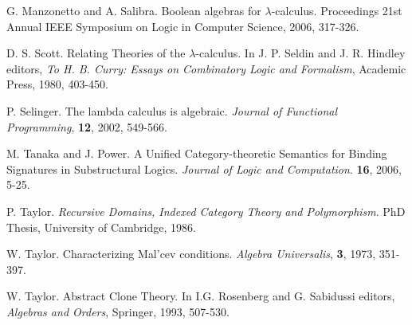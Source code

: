 \documentclass[12pt, amstex, amssymb]{article}
\begin{document}
\begin{thebibliography}{length}
G. Manzonetto and A. Salibra. Boolean algebras for $\lambda$-calculus.
Proceedings 21st Annual IEEE Symposium on Logic in Computer Science, 2006,
317-326.


D. S. Scott. Relating Theories of the $\lambda$-calculus.
In J. P. Seldin and J. R.  Hindley editors,
{\it To H. B. Curry: Essays on Combinatory Logic and Formalism},
Academic Press, 1980, 403-450.

P. Selinger. The lambda calculus is algebraic. 
{\em Journal of Functional
Programming}, {\bf 12}, 2002, 549-566.

M. Tanaka and J. Power. A Unified Category-theoretic 
Semantics for Binding Signatures in Substructural Logics. 
{\it Journal of Logic and Computation}. {\bf 16}, 2006, 5-25.

P. Taylor. {\em Recursive Domains, Indexed Category Theory
and Polymorphism}. PhD Thesis, University of Cambridge, 1986.

W. Taylor. Characterizing {M}al'cev conditions.
{\em Algebra Universalis}, {\bf 3}, 1973, 351-397.

W. Taylor. Abstract Clone Theory.
In I.G. Rosenberg and G. Sabidussi editors, {\em Algebras and Orders},
Springer, 1993, 507-530.

\end{thebibliography}
\end{document}
